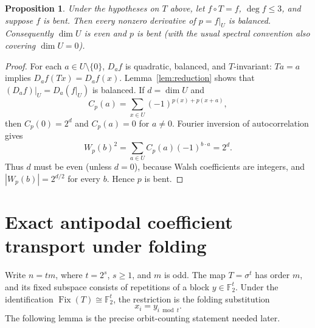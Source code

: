 \documentclass[11pt,a4paper]{article}
\newtheorem{proposition}[theorem]{Proposition}
\newcommand{\F}{\mathbb F_2}
\newcommand{\Fix}{\operatorname{Fix}}
\begin{document}
\begin{proposition}\label{prop:restriction}
Under the hypotheses on $T$ above, let $f\circ T=f$, $\deg f\le3$, and suppose $f$ is bent. Then every nonzero derivative of $p=f|_U$ is balanced. Consequently $\dim U$ is even and $p$ is bent (with the usual spectral convention also covering $\dim U=0$).
\end{proposition}
\begin{proof}
For each $a\in U\setminus\{0\}$, $D_af$ is quadratic, balanced, and $T$-invariant: $Ta=a$ implies $D_af(Tx)=D_af(x)$. Lemma~\ref{lem:reduction} shows that $(D_af)|_U=D_a(f|_U)$ is balanced. If $d=\dim U$ and
\[
C_p(a)=\sum_{x\in U}(-1)^{p(x)+p(x+a)},
\]
then $C_p(0)=2^d$ and $C_p(a)=0$ for $a\ne0$. Fourier inversion of autocorrelation gives
\[
W_p(b)^2=\sum_{a\in U}C_p(a)(-1)^{b\cdot a}=2^d.
\]
Thus $d$ must be even (unless $d=0$), because Walsh coefficients are integers, and $|W_p(b)|=2^{d/2}$ for every $b$. Hence $p$ is bent.
\end{proof}

\section{Exact antipodal coefficient transport under folding}
Write $n=tm$, where $t=2^s$, $s\ge1$, and $m$ is odd. The map $T=\sigma^t$ has order $m$, and its fixed subspace consists of repetitions of a block $y\in\F^t$. Under the identification $\Fix(T)\cong\F^t$, the restriction is the folding substitution
\[
x_i=y_{i\bmod t}.
\]
The following lemma is the precise orbit-counting statement needed later.
\end{document}
